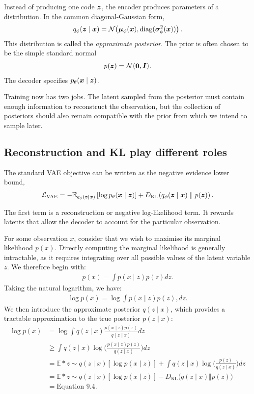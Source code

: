 Instead of producing one code \(\bm{z}\), the encoder produces parameters of a distribution. In the common diagonal-Gaussian form,
\[
  q_\phi(\bm{z}\mid\bm{x})
  = \mathcal{N}\!\left(
      \bm{\mu}_\phi(\bm{x}),
      \operatorname{diag}(\bm{\sigma}_\phi^2(\bm{x}))
    \right).
\]
This distribution is called the \emph{approximate posterior}. The prior is often chosen to be the simple standard normal
\[
  p(\bm{z})=\mathcal{N}(\bm{0},\bm{I}).
\]
The decoder specifies \(p_\theta(\bm{x}\mid\bm{z})\).

Training now has two jobs. The latent sampled from the posterior must contain enough information to reconstruct the observation, but the collection of posteriors should also remain compatible with the prior from which we intend to sample later.

\subsection{Reconstruction and KL play different roles}

The standard VAE objective can be written as the negative evidence lower bound,
\begin{equation}
  \mathcal{L}_{\mathrm{VAE}}
  =
  -\mathbb{E}_{q_\phi(\bm{z}\mid\bm{x})}
     \left[\log p_\theta(\bm{x}\mid\bm{z})\right]
  +
  D_{\mathrm{KL}}\!\left(
    q_\phi(\bm{z}\mid\bm{x})
    \;\|\;
    p(\bm{z})
  \right).
  \label{eq:week8-vae-loss}
\end{equation}

The first term is a reconstruction or negative log-likelihood term. It rewards latents that allow the decoder to account for the particular observation.

\begin{optionalexercise}[title={Mathematical Derivation}]
For some observation $x$, consider that we wish to maximise its marginal likelihood $p(x)$. Directly computing the marginal likelihood is generally intractable, as it requires integrating over all possible values of the latent variable $z$. We therefore begin with:
\begin{align*}
p(x) = \int p(x\mid z)p(z)dz.
\end{align*}
Taking the natural logarithm, we have:
\begin{align*}
\log p(x) = \log \int p(x\mid z)p(z),dz.
\end{align*}
We then introduce the approximate posterior $q(z\mid x)$, which provides a tractable approximation to the true posterior $p(z\mid x)$:
\begin{align*}
\log p(x)
&= \log \int q(z\mid x)
\frac{p(x\mid z)p(z)}{q(z\mid x)}dz \\
&\geq \int q(z\mid x)
\log \bigg(
\frac{p(x\mid z)p(z)}{q(z\mid x)}
\bigg)dz \\
&= \mathbb{E}*{z\sim q(z\mid x)}
[\log p(x\mid z)]
+ \int q(z\mid x)
\log\bigg(
\frac{p(z)}{q(z\mid x)}
\bigg)dz \\
&= \mathbb{E}*{z\sim q(z\mid x)}
[\log p(x\mid z)]
- D_{\mathrm{KL}}\big(q(z\mid x)\Vert p(z)\big) \\
&= \text{Equation 9.4}.
\end{align*}
\end{optionalexercise}



